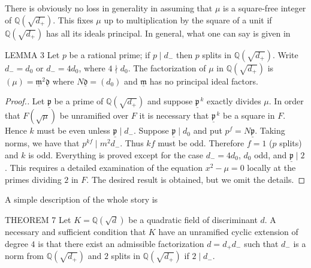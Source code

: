 There is obviously no loss in generality in assuming that $\mu$ is a
square-free integer of $\mathbb{Q}(\sqrt{d_{+}})$. This fixes $\mu$ up to
multiplication by the square of a unit if $\mathbb{Q}(\sqrt{d_{+}})$ has
all its ideals principal. In general, what one can say is given in

\begin{namedstmt}{LEMMA 3}
Let $p$ be a rational prime; if $p\mid d_{-}$ then $p$ splits in
$\mathbb{Q}(\sqrt{d_{+}})$. Write $d_{-}=d_{0}$ or $d_{-}=4d_{0}$,
where $4\nmid d_{0}$. The factorization of $\mu$ in
$\mathbb{Q}(\sqrt{d_{+}})$ is $(\mu)=\underline{\mathfrak{m}}^{2}
\underline{\mathfrak{d}}$ where $N\underline{\mathfrak{d}}=(d_{0})$ and
$\underline{\mathfrak{m}}$ has no principal ideal factors.
\end{namedstmt}

\begin{proof}[Proof.]
Let $\underline{\mathfrak{p}}$ be a prime of $\mathbb{Q}(\sqrt{d_{+}})$
and suppose $\underline{\mathfrak{p}}^{\,k}$ exactly divides $\mu$. In
order that $F(\sqrt{\mu})$ be unramified over $F$ it is necessary that
$\underline{\mathfrak{p}}^{\,k}$ be a square in $F$. Hence $k$ must be
even unless $\underline{\mathfrak{p}}\mid d_{-}$. Suppose
$\underline{\mathfrak{p}}\mid d_{0}$ and put $p^{f}=N\underline{
\mathfrak{p}}$. Taking norms, we have that $p^{kf}\mid m^{2}d_{-}$. Thus
$kf$ must be odd. Therefore $f=1$ ($p$ splits) and $k$ is odd. Everything
is proved except for the case $d_{-}=4d_{0}$, $d_{0}$ odd, and
$\underline{\mathfrak{p}}\mid 2$. This requires a detailed examination of
the equation $x^{2}-\mu=0$ locally at the primes dividing $2$ in $F$.
The desired result is obtained, but we omit the details.
\end{proof}

A simple description of the whole story is

\begin{namedstmt}{THEOREM 7}
Let $K=\mathbb{Q}(\sqrt{d})$ be a quadratic field of discriminant $d$. A
necessary and sufficient condition that $K$ have an unramified cyclic
extension of degree $4$ is that there exist an admissible factorization
$d=d_{+}d_{-}$ such that $d_{-}$ is a norm from
$\mathbb{Q}(\sqrt{d_{+}})$ and $2$ splits in
$\mathbb{Q}(\sqrt{d_{+}})$ if $2\mid d_{-}$.
\end{namedstmt}

